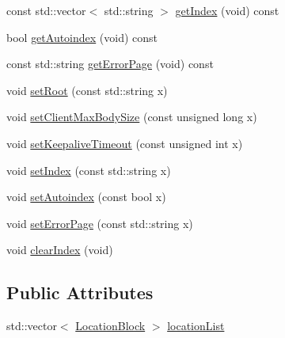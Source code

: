 \begin{DoxyCompactItemize}
\item 
const std\+::vector$<$ std\+::string $>$ \hyperlink{classft_1_1_base_directives_a018f34a5ffd66e891494b5c0ee69177b}{get\+Index} (void) const
\item 
bool \hyperlink{classft_1_1_base_directives_a4c11ed7ad76aeac228b029a2444de568}{get\+Autoindex} (void) const
\item 
const std\+::string \hyperlink{classft_1_1_base_directives_a3cb0c21f17781de392d5ee09d7190caf}{get\+Error\+Page} (void) const
\item 
void \hyperlink{classft_1_1_base_directives_a2a7990e309f7e38f2915dbbb0d2704cf}{set\+Root} (const std\+::string x)
\item 
void \hyperlink{classft_1_1_base_directives_a39bf4922f3236043c76beaffaa557a3b}{set\+Client\+Max\+Body\+Size} (const unsigned long x)
\item 
void \hyperlink{classft_1_1_base_directives_a0818b8529872ba9622329e2118d20c39}{set\+Keepalive\+Timeout} (const unsigned int x)
\item 
void \hyperlink{classft_1_1_base_directives_a6d3d8fd6eaaf71304128af6b3cee2a69}{set\+Index} (const std\+::string x)
\item 
void \hyperlink{classft_1_1_base_directives_ae7293c7bbf34e9bdc60c540dccd53342}{set\+Autoindex} (const bool x)
\item 
void \hyperlink{classft_1_1_base_directives_a505ecc88b3e1779583ad60cc243c7769}{set\+Error\+Page} (const std\+::string x)
\item 
void \hyperlink{classft_1_1_base_directives_a36d96dc74e650162c25a325813130ab2}{clear\+Index} (void)
\end{DoxyCompactItemize}
\subsection*{Public Attributes}
\begin{DoxyCompactItemize}
\item 
std\+::vector$<$ \hyperlink{classft_1_1_location_block}{Location\+Block} $>$ \hyperlink{classft_1_1_server_block_a225584d0d52d59571dd7ba84149901ce}{location\+List}
\end{DoxyCompactItemize}

